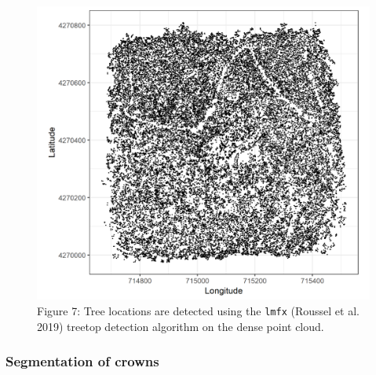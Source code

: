 \documentclass[]{article}
\begin{document}
\begin{figure}
\centering
\includegraphics{../../figures/eldo_3k_3_ttops.png}
\caption{Figure 7: Tree locations are detected using the \texttt{lmfx}
(Roussel et al. 2019) treetop detection algorithm on the dense point
cloud.}
\end{figure}

\subsubsection{Segmentation of crowns}\label{segmentation-of-crowns}
\end{document}
